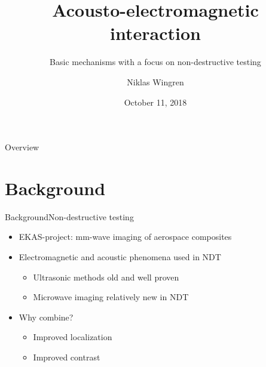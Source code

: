 \documentclass[11pt]{beamer}
\begin{document}
	\author{Niklas Wingren}
	\title{Acousto-electromagnetic interaction}
	\subtitle{Basic mechanisms with a focus on non-destructive testing}
	\date{October 11, 2018}
	\frame[plain]{\maketitle}
	
	\begin{frame}{Overview}
		\tableofcontents
	\end{frame}
	
	
	\section{Background}
	\begin{frame}{Background}{Non-destructive testing}
		\pause
		\begin{itemize}
			\item EKAS-project: mm-wave imaging of aerospace composites
			\pause
			\item Electromagnetic and acoustic phenomena used in NDT
			\begin{itemize}
				\pause
				\item Ultrasonic methods old and well proven
				\pause
				\item Microwave imaging relatively new in NDT
			\end{itemize}
			\pause
			\item Why combine?
			\pause
			\begin{itemize}
				\item Improved localization
				\pause
				\item Improved contrast
			\end{itemize}
		\end{itemize}
	\end{frame}
	
\end{document}
